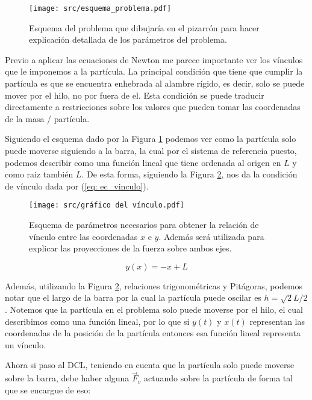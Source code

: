 \documentclass{article}
\begin{document}
\begin{multicols}{2}
\begin{figure}[H]
    \centering
    \texttt{[image: src/esquema\_problema.pdf]}
    \caption{
        Esquema del problema que dibujaría en el pizarrón para hacer explicación detallada de los parámetros del problema.
    }
    \label{fig: diagrama_problema}
\end{figure}

Previo a aplicar las ecuaciones de Newton me parece importante ver los vínculos que le imponemos a la partícula. La principal condición que tiene que cumplir la partícula es que se encuentra enhebrada al alambre rígido, es decir, solo se puede mover por el hilo, no por fuera de el. Esta condición se puede traducir directamente a restricciones sobre los valores que pueden tomar las coordenadas de la masa / partícula.

Siguiendo el esquema dado por la Figura \ref{fig: diagrama_problema} podemos ver como la partícula solo puede moverse siguiendo a la barra, la cual por el sistema de referencia puesto, podemos describir como una función lineal que tiene ordenada al origen en $L$ y como raiz también $L$. De esta forma, siguiendo la Figura \ref{fig: vinculo}, nos da la condición de vínculo dada por (\ref{eq: ec_vinculo}).

\begin{figure}[H]
    \centering
    \texttt{[image: src/gráfico del vínculo.pdf]}
    \captionsetup{aboveskip=0pt, belowskip=0pt}
    \caption{
        Esquema de parámetros necesarios para obtener la relación de vínculo entre las coordenadas $x$ e $y$. Además será utilizada para explicar las proyecciones de la fuerza sobre ambos ejes.
    }
    \label{fig: vinculo}
\end{figure}

\begin{equation}
    y(x) = -x + L
    \label{eq: ec_vinculo}
\end{equation}

Además, utilizando la Figura \ref{fig: vinculo}, relaciones trigonométricas y Pitágoras, podemos notar que el largo de la barra por la cual la partícula puede oscilar es $h = \sqrt{2}L/2$.
Notemos que la partícula en el problema solo puede moverse por el hilo, el cual describimos como una función lineal, por lo que si $y(t)$ y $x(t)$ representan las coordenadas de la posición de la partícula entonces esa función lineal representa un vínculo.

Ahora si paso al DCL, teniendo en cuenta que la partícula solo puede moverse sobre la barra, debe haber alguna $\vec{F}_{v}$ actuando sobre la partícula de forma tal que se encargue de eso:


\end{multicols}
\end{document}
